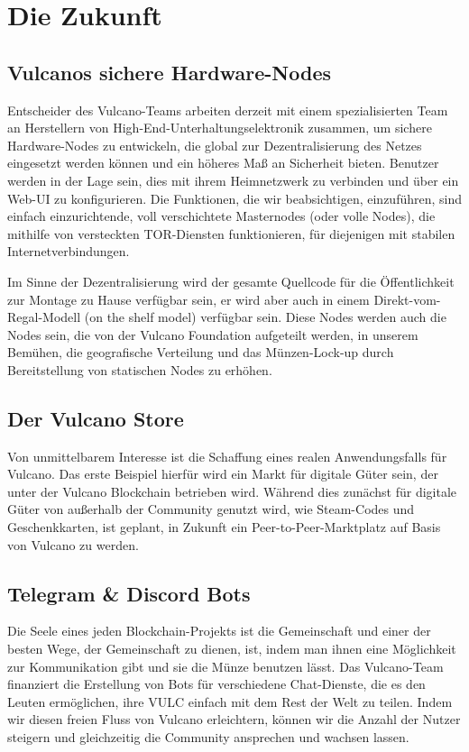 \documentclass[A4paper, 12pt]{article}
\begin{document}
\section{Die Zukunft}
\subsection{Vulcanos sichere Hardware-Nodes}
Entscheider des Vulcano-Teams arbeiten derzeit mit einem spezialisierten Team an Herstellern von High-End-Unterhaltungselektronik zusammen, um sichere Hardware-Nodes zu entwickeln, die global zur Dezentralisierung des Netzes eingesetzt werden können und ein höheres Maß an Sicherheit bieten. Benutzer werden in der Lage sein, dies mit ihrem Heimnetzwerk zu verbinden und über ein Web-UI zu konfigurieren. Die Funktionen, die wir beabsichtigen, einzuführen, sind einfach einzurichtende, voll verschichtete Masternodes (oder volle Nodes), die mithilfe von versteckten TOR-Diensten funktionieren, für diejenigen mit stabilen Internetverbindungen. 

Im Sinne der Dezentralisierung wird der gesamte Quellcode  für die Öffentlichkeit zur Montage zu Hause verfügbar sein, er wird aber auch in einem Direkt-vom-Regal-Modell (on the shelf model) verfügbar sein. Diese Nodes werden auch die Nodes sein, die von der Vulcano Foundation aufgeteilt werden, in unserem Bemühen, die geografische  Verteilung und das Münzen-Lock-up durch Bereitstellung von statischen Nodes zu erhöhen. 

\subsection{Der Vulcano Store}
Von unmittelbarem Interesse ist die Schaffung eines realen Anwendungsfalls für Vulcano. 
Das erste Beispiel hierfür wird ein Markt für digitale Güter sein, der unter der Vulcano Blockchain betrieben wird. Während dies zunächst für digitale Güter von außerhalb der Community genutzt wird, wie Steam-Codes und Geschenkkarten, ist geplant, in Zukunft ein Peer-to-Peer-Marktplatz auf Basis von Vulcano zu werden. 

\subsection{Telegram \& Discord Bots}
Die Seele eines jeden Blockchain-Projekts ist die Gemeinschaft und einer der besten Wege, der Gemeinschaft zu dienen, ist, indem man ihnen eine Möglichkeit zur Kommunikation gibt und sie die Münze benutzen lässt. Das Vulcano-Team finanziert die Erstellung von Bots für verschiedene Chat-Dienste, die es den Leuten ermöglichen, ihre VULC einfach mit dem Rest der Welt zu teilen. Indem wir diesen freien Fluss von Vulcano erleichtern, können wir die Anzahl der Nutzer steigern und gleichzeitig die Community ansprechen und wachsen lassen. 
\end{document}

